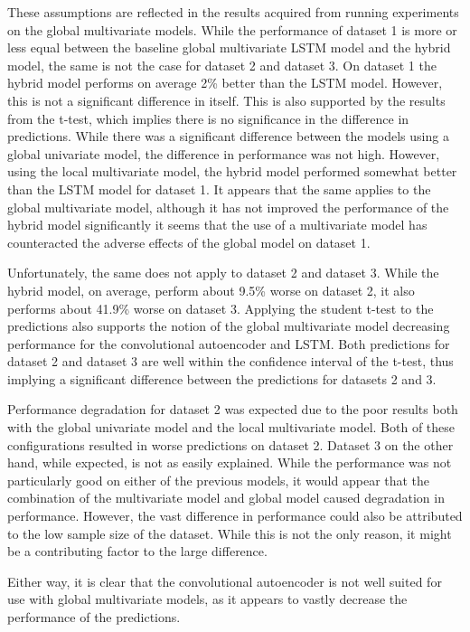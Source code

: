 These assumptions are reflected in the results acquired from running experiments on the global multivariate models.
While the performance of dataset 1 is more or less equal between the baseline global multivariate LSTM model and the hybrid model,
the same is not the case for dataset 2 and dataset 3.
On dataset 1 the hybrid model performs on average 2\% better than the LSTM model. However, this is not a significant difference in itself.
This is also supported by the results from the t-test, which implies there is no significance in the difference in predictions.
While there was a significant difference between the models using a global univariate model, the difference in performance was not high.
However, using the local multivariate model, the hybrid model performed somewhat better than the LSTM model for dataset 1.
It appears that the same applies to the global multivariate model, although it has not improved the performance of the hybrid model significantly
it seems that the use of a multivariate model has counteracted the adverse effects of the global model on dataset 1.

Unfortunately, the same does not apply to dataset 2 and dataset 3.
While the hybrid model, on average, perform about 9.5\% worse on dataset 2, it also performs about 41.9\% worse on dataset 3.
Applying the student t-test to the predictions also supports the notion of the global multivariate model decreasing performance for the
convolutional autoencoder and LSTM.
Both predictions for dataset 2 and dataset 3 are well within the confidence interval of the t-test,
thus implying a significant difference between the predictions for datasets 2 and 3.

Performance degradation for dataset 2 was expected due to the poor results both with the global univariate model and the local multivariate model.
Both of these configurations resulted in worse predictions on dataset 2.
Dataset 3 on the other hand, while expected, is not as easily explained.
While the performance was not particularly good on either of the previous models, it would appear that the combination of the multivariate model and global model
caused degradation in performance.
However, the vast difference in performance could also be attributed to the low sample size of the dataset.
While this is not the only reason, it might be a contributing factor to the large difference.

Either way, it is clear that the convolutional autoencoder is not well suited for use with global multivariate models, as it appears to
vastly decrease the performance of the predictions.








